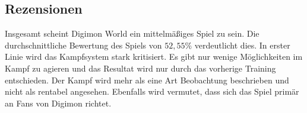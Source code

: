 \subsection{Rezensionen}
Insgesamt scheint Digimon World ein mittelmäßiges Spiel zu sein. Die durchschnittliche Bewertung des Spiels von $52{,}55\%$ verdeutlicht dies\cite{metacritic-gamerankings}. In erster Linie wird das Kampfsystem stark kritisiert. Es gibt nur wenige Möglichkeiten im Kampf zu agieren und das Resultat wird nur durch das vorherige Training entschieden\cite{ign}. Der Kampf wird mehr als eine Art Beobachtung beschrieben und nicht als rentabel angesehen. Ebenfalls wird vermutet, dass sich das Spiel primär an Fans von Digimon richtet\cite{gamespot}. 